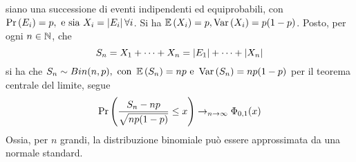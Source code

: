 \documentclass{subfiles}
\begin{document}
\begin{Remark*}
    siano  una successione di eventi indipendenti ed equiprobabili, con \(\Prob{E_{i}} = p, \text{e sia} X_{i} = \Abs{E_{i}} \forall i\).
    Si ha \(\Expected{X_{i}} = p, \Var{X_{i}} = p(1 - p)\).
    Posto, per ogni \(n \in \operatorname{\mathbb{N}}\), che
    \[
        S_{n} = X_{1} + \cdots + X_{n} = \left\vert {E_{1}} \right\vert + \cdots +\left\vert {X_{n}} \right\vert
    \]
    si ha che \(S_{n} \sim Bin(n, p), \text{con} \Expected{S_{n}} = np \text{e} \Var{S_{n}} = np(1 - p)\)
    per il teorema centrale del limite, segue
    \[
        \Prob{\Frac{S_{n} - np}{\sqrt{np(1-p)}} \le x} \to_{n \to \infty} \Phi_{0, 1}(x)
    \]
    Ossia, per \(n\) grandi, la distribuzione binomiale può essere approssimata da una normale standard.
\end{Remark*}
\end{document}
